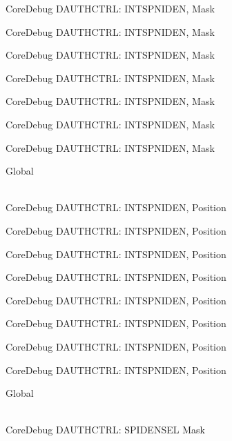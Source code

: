 \begin{DoxyRefList}
\label{deprecated__deprecated000140}%
%
Core\+Debug DAUTHCTRL\+: INTSPNIDEN, Mask 

\label{deprecated__deprecated000216}%
%
Core\+Debug DAUTHCTRL\+: INTSPNIDEN, Mask 

\label{deprecated__deprecated000279}%
%
Core\+Debug DAUTHCTRL\+: INTSPNIDEN, Mask 

\label{deprecated__deprecated000358}%
%
Core\+Debug DAUTHCTRL\+: INTSPNIDEN, Mask 

\label{deprecated__deprecated000434}%
%
Core\+Debug DAUTHCTRL\+: INTSPNIDEN, Mask 

\label{deprecated__deprecated000537}%
%
Core\+Debug DAUTHCTRL\+: INTSPNIDEN, Mask 

\label{deprecated__deprecated000639}%
%
Core\+Debug DAUTHCTRL\+: INTSPNIDEN, Mask  
\item[{\parbox[t]{\linewidth}{Global \doxylink{group___c_m_s_i_s___s_c_b_gaf733a36e6b4717a604f7d77c05dfceb4}{Core\+Debug\+\_\+\+DAUTHCTRL\+\_\+\+INTSPNIDEN\+\_\+\+Pos} }}]\hfill \\
\label{deprecated__deprecated000085}%
%
Core\+Debug DAUTHCTRL\+: INTSPNIDEN, Position 

\label{deprecated__deprecated000139}%
%
Core\+Debug DAUTHCTRL\+: INTSPNIDEN, Position 

\label{deprecated__deprecated000215}%
%
Core\+Debug DAUTHCTRL\+: INTSPNIDEN, Position 

\label{deprecated__deprecated000278}%
%
Core\+Debug DAUTHCTRL\+: INTSPNIDEN, Position 

\label{deprecated__deprecated000357}%
%
Core\+Debug DAUTHCTRL\+: INTSPNIDEN, Position 

\label{deprecated__deprecated000433}%
%
Core\+Debug DAUTHCTRL\+: INTSPNIDEN, Position 

\label{deprecated__deprecated000536}%
%
Core\+Debug DAUTHCTRL\+: INTSPNIDEN, Position 

\label{deprecated__deprecated000638}%
%
Core\+Debug DAUTHCTRL\+: INTSPNIDEN, Position  
\item[{\parbox[t]{\linewidth}{Global \doxylink{group___c_m_s_i_s___s_c_b_gaa043fd13768d57be320c682ca1c9b234}{Core\+Debug\+\_\+\+DAUTHCTRL\+\_\+\+SPIDENSEL\+\_\+\+Msk} }}]\hfill \\
\label{deprecated__deprecated000092}%
%
Core\+Debug DAUTHCTRL\+: SPIDENSEL Mask 


\end{DoxyRefList}
